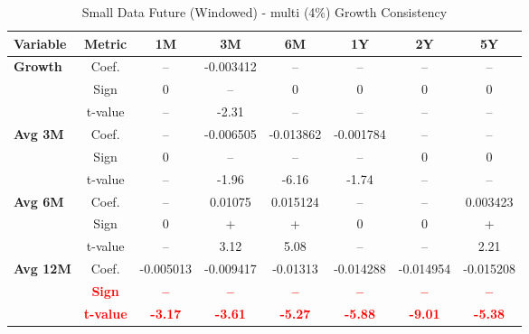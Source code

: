 \documentclass[11pt,english,a4paper,hidelinks]{book}
\begin{document}
\begin{table}[H]
    \centering
    \caption{Small Data Future (Windowed) - \acrshort{multi} (4\%) Growth Consistency}
    \begin{tabular}{lccccccc}
        \toprule
        \textbf{Variable} & \textbf{Metric} & \textbf{1M} & \textbf{3M} & \textbf{6M} & \textbf{1Y} & \textbf{2Y} & \textbf{5Y} \\
        \midrule
        \multirow{3}{*}{\textbf{Growth}}
            & Coef.   & --        & -0.003412 & --        & --        & --        & --        \\
            & Sign    & 0         & –         & 0         & 0         & 0         & 0         \\
            & t-value & --        & -2.31     & --        & --        & --        & --        \\
        \cmidrule{1-8}
        \multirow{3}{*}{\textbf{Avg 3M}}
            & Coef.   & --        & -0.006505 & -0.013862 & -0.001784 & --        & --        \\
            & Sign    & 0         & –         & –         & –         & 0         & 0         \\
            & t-value & --        & -1.96     & -6.16     & -1.74     & --        & --        \\
        \cmidrule{1-8}
        \multirow{3}{*}{\textbf{Avg 6M}}
            & Coef.   & --        & 0.01075   & 0.015124  & --        & --        & 0.003423  \\
            & Sign    & 0         & +         & +         & 0         & 0         & +         \\
            & t-value & --        & 3.12      & 5.08      & --        & --        & 2.21      \\
        \cmidrule{1-8}
        \multirow{3}{*}{\textbf{Avg 12M}}
            & Coef.   & -0.005013 & -0.009417 & -0.01313  & -0.014288 & -0.014954 & -0.015208 \\
            & \textbf{\textcolor{red}{Sign}}    & \textbf{\textcolor{red}{–}}         & \textbf{\textcolor{red}{–}}         & \textbf{\textcolor{red}{–}}         & \textbf{\textcolor{red}{–}}         & \textbf{\textcolor{red}{–}}         & \textbf{\textcolor{red}{–}}         \\
            & \textbf{\textcolor{red}{t-value}} & \textbf{\textcolor{red}{-3.17}}     & \textbf{\textcolor{red}{-3.61}}     & \textbf{\textcolor{red}{-5.27}}     & \textbf{\textcolor{red}{-5.88}}     & \textbf{\textcolor{red}{-9.01}}     & \textbf{\textcolor{red}{-5.38}}     \\

\end{tabular}
\end{table}
\end{document}
